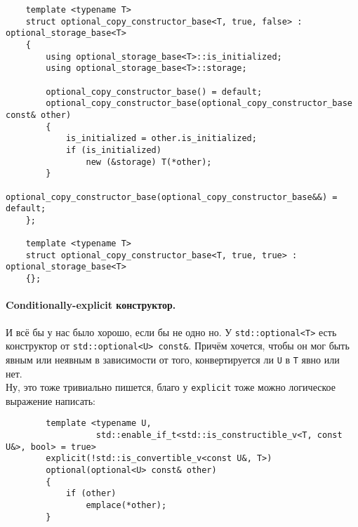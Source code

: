 \documentclass{article}
\begin{document}
    \pagebreak
    \begin{verbatim}
    template <typename T>
    struct optional_copy_constructor_base<T, true, false> : optional_storage_base<T>
    {
        using optional_storage_base<T>::is_initialized;
        using optional_storage_base<T>::storage;
        
        optional_copy_constructor_base() = default;
        optional_copy_constructor_base(optional_copy_constructor_base const& other)
        {
            is_initialized = other.is_initialized;
            if (is_initialized)
                new (&storage) T(*other);
        }
        optional_copy_constructor_base(optional_copy_constructor_base&&) = default;
    };
    
    template <typename T>
    struct optional_copy_constructor_base<T, true, true> : optional_storage_base<T>
    {};
    \end{verbatim}
    \paragraph{Conditionally-explicit конструктор.}
    И всё бы у нас было хорошо, если бы не одно но. У \texttt{std::optional<T>} есть конструктор от \texttt{std::optional<U> const&}. Причём хочется, чтобы он мог быть явным или неявным в зависимости от того, конвертируется ли \texttt{U} в  \texttt{T} явно или нет.\\
    Ну, это тоже тривиально пишется, благо у \texttt{explicit} тоже можно логическое выражение написать:
    \begin{verbatim}
        template <typename U,
                  std::enable_if_t<std::is_constructible_v<T, const U&>, bool> = true>
        explicit(!std::is_convertible_v<const U&, T>)
        optional(optional<U> const& other)
        {
            if (other)
                emplace(*other);
        }
    \end{verbatim}
\end{document}

